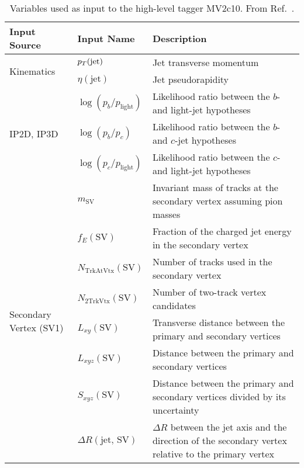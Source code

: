 \begin{table}[!htb]
    \caption{
        Variables used as input to the high-level tagger MV2c10.
        From Ref.~\cite{ATL-PHYS-PUB-2015-022}.
    }
    \label{tab:ftag_mv2_inputs}
    \begin{scriptsize}
    \begin{center}
    \begin{tabularx}{\textwidth}{|X|l|X|}
    \hline
    \hline
    \textbf{Input Source} & \textbf{Input Name} & \textbf{Description} \\
    \hline
    \multirow{2}{*}{Kinematics} & $p_{T}(\text{jet})$ & Jet transverse momentum \\
    \cline{2-3}
                & $\eta(\text{jet})$ & Jet pseudorapidity \\
    \hline
    \multirow{3}{*}{IP2D, IP3D} & $\log(p_b/p_{\text{light}})$ & Likelihood ratio between the $b$- and light-jet hypotheses \\
    \cline{2-3}
                & $\log(p_b / p_c)$ & Likelihood ratio between the $b$- and $c$-jet hypotheses \\
    \cline{2-3}
                & $\log(p_c / p_{\text{light}})$ & Likelihood ratio between the $c$- and light-jet hypotheses \\
    \hline
    \multirow{8}{*}{Secondary Vertex (SV1)} & $m_{\text{SV}}$ & Invariant mass of tracks at the secondary vertex assuming pion masses \\
    \cline{2-3}
            & $f_E(\text{SV})$ & Fraction of the charged jet energy in the secondary vertex \\
    \cline{2-3}
            & $N_{\text{TrkAtVtx}}(\text{SV})$ & Number of tracks used in the secondary vertex \\
    \cline{2-3}
            & $N_{\text{2TrkVtx}}(\text{SV})$ & Number of two-track vertex candidates \\
    \cline{2-3}
            & $L_{xy}(\text{SV})$ & Transverse distance between the primary and secondary vertices \\
    \cline{2-3}
            & $L_{xyz}(\text{SV})$ & Distance between the primary and secondary vertices \\
    \cline{2-3}
            & $S_{xyz}(\text{SV})$ & Distance between the primary and secondary vertices divided by its uncertainty \\
    \cline{2-3}
            & $\Delta R(\text{jet, SV})$ & $\Delta R$ between the jet axis and the direction of the secondary vertex relative to the primary vertex \\

\end{tabularx}
\end{center}
\end{scriptsize}
\end{table}

